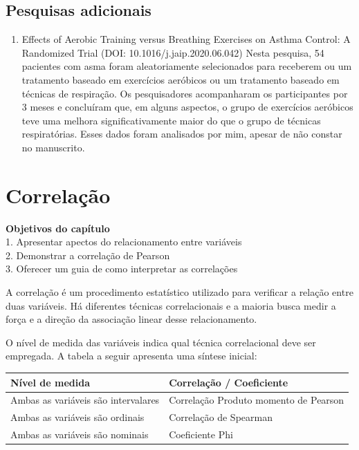 \documentclass[
]{book}
\providecommand{\tightlist}{%
  \setlength{\itemsep}{0pt}\setlength{\parskip}{0pt}}
\newenvironment{objectives}{
  \definecolor{shadecolor}{rgb}{0.764,0.992,0.686}  %
  \color{black}
  \begin{shaded}}
 {\end{shaded}}
\begin{document}
\hypertarget{pesquisas-adicionais-6}{%
\section{Pesquisas adicionais}\label{pesquisas-adicionais-6}}

\begin{enumerate}
\def\labelenumi{\arabic{enumi}.}
\tightlist
\item
  Effects of Aerobic Training versus Breathing Exercises on Asthma Control: A Randomized Trial (DOI: 10.1016/j.jaip.2020.06.042)
  Nesta pesquisa, 54 pacientes com asma foram aleatoriamente selecionados para receberem ou um tratamento baseado em exercícios aeróbicos ou um tratamento baseado em técnicas de respiração. Os pesquisadores acompanharam os participantes por 3 meses e concluíram que, em alguns aspectos, o grupo de exercícios aeróbicos teve uma melhora significativamente maior do que o grupo de técnicas respiratórias. Esses dados foram analisados por mim, apesar de não constar no manuscrito.
\end{enumerate}

\hypertarget{correlauxe7uxe3o}{%
\chapter{Correlação}\label{correlauxe7uxe3o}}

\begin{objectives}
\textbf{Objetivos do capítulo}\\
1. Apresentar apectos do relacionamento entre variáveis\\
2. Demonstrar a correlação de Pearson\\
3. Oferecer um guia de como interpretar as correlações

\end{objectives}

A correlação é um procedimento estatístico utilizado para verificar a relação entre duas variáveis. Há diferentes técnicas correlacionais e a maioria busca medir a força e a direção da associação linear desse relacionamento.

O nível de medida das variáveis indica qual técnica correlacional deve ser empregada. A tabela a seguir apresenta uma síntese inicial:

\begin{longtable}[]{@{}ll@{}}
\toprule
Nível de medida & Correlação / Coeficiente \\
\midrule
\endhead
Ambas as variáveis são intervalares & Correlação Produto momento de Pearson \\
Ambas as variáveis são ordinais & Correlação de Spearman \\
Ambas as variáveis são nominais & Coeficiente Phi \\
\bottomrule
\end{longtable}
\end{document}
